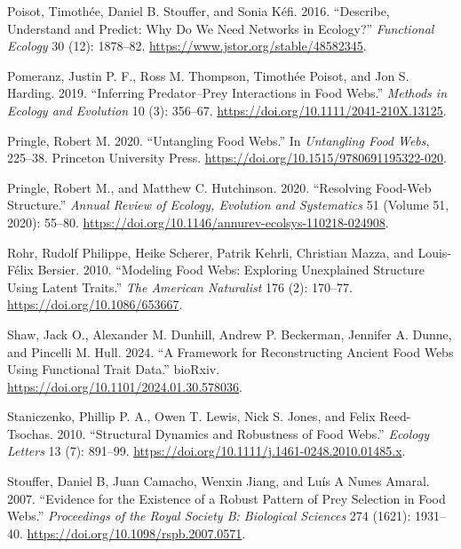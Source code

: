 \documentclass[
  letterpaper,
  DIV=11,
  numbers=noendperiod]{scrartcl}
\newlength{\cslhangindent}
\newenvironment{CSLReferences}[2] %
 {\begin{list}{}{%
  \setlength{\itemindent}{0pt}
  \setlength{\leftmargin}{0pt}
  \setlength{\parsep}{0pt}
  \ifodd #1
   \setlength{\leftmargin}{\cslhangindent}
   \setlength{\itemindent}{-1\cslhangindent}
  \fi
  \setlength{\itemsep}{#2\baselineskip}}}
 {\end{list}}
\begin{document}
\begin{CSLReferences}{1}{0}
Poisot, Timothée, Daniel B. Stouffer, and Sonia Kéfi. 2016. {``Describe,
Understand and Predict: Why Do We Need Networks in Ecology?''}
\emph{Functional Ecology} 30 (12): 1878--82.
\url{https://www.jstor.org/stable/48582345}.

Pomeranz, Justin P. F., Ross M. Thompson, Timothée Poisot, and Jon S.
Harding. 2019. {``Inferring Predator--Prey Interactions in Food Webs.''}
\emph{Methods in Ecology and Evolution} 10 (3): 356--67.
\url{https://doi.org/10.1111/2041-210X.13125}.

Pringle, Robert M. 2020. {``Untangling {Food Webs}.''} In
\emph{Untangling {Food Webs}}, 225--38. Princeton University Press.
\url{https://doi.org/10.1515/9780691195322-020}.

Pringle, Robert M., and Matthew C. Hutchinson. 2020. {``Resolving
{Food-Web Structure}.''} \emph{Annual Review of Ecology, Evolution and
Systematics} 51 (Volume 51, 2020): 55--80.
\url{https://doi.org/10.1146/annurev-ecolsys-110218-024908}.

Rohr, Rudolf Philippe, Heike Scherer, Patrik Kehrli, Christian Mazza,
and Louis-Félix Bersier. 2010. {``Modeling {Food Webs}: {Exploring
Unexplained Structure Using Latent Traits}.''} \emph{The American
Naturalist} 176 (2): 170--77. \url{https://doi.org/10.1086/653667}.

Shaw, Jack O., Alexander M. Dunhill, Andrew P. Beckerman, Jennifer A.
Dunne, and Pincelli M. Hull. 2024. {``A Framework for Reconstructing
Ancient Food Webs Using Functional Trait Data.''} bioRxiv.
\url{https://doi.org/10.1101/2024.01.30.578036}.

Staniczenko, Phillip P. A., Owen T. Lewis, Nick S. Jones, and Felix
Reed-Tsochas. 2010. {``Structural Dynamics and Robustness of Food
Webs.''} \emph{Ecology Letters} 13 (7): 891--99.
\url{https://doi.org/10.1111/j.1461-0248.2010.01485.x}.

Stouffer, Daniel B, Juan Camacho, Wenxin Jiang, and Luís A Nunes Amaral.
2007. {``Evidence for the Existence of a Robust Pattern of Prey
Selection in Food Webs.''} \emph{Proceedings of the Royal Society B:
Biological Sciences} 274 (1621): 1931--40.
\url{https://doi.org/10.1098/rspb.2007.0571}.


\end{CSLReferences}
\end{document}
